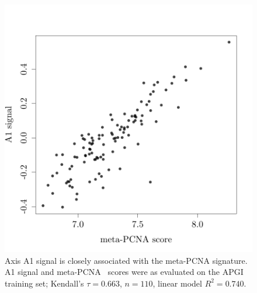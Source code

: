 \documentclass[dissertation.tex]{subfiles}
\begin{document}
\begin{figure}[!htbp]
\centering
\includegraphics[width=.7\linewidth]{analysis/biosurv/reports/18_SIS_diag_dsd_final/figure/nmf-msigdb-cor-plots-5}
\caption[A1 signal is closely associated with meta-PCNA score]{Axis A1 signal is closely associated with the meta-PCNA signature.  A1 signal and meta-PCNA~\cite{Venet2011} scores were as evaluated on the \acrshort{APGI} training set; Kendall's $\tau = 0.663$, $n = 110$, linear model $R^2 = 0.740$.}\label{fig:sigs-axis1-pcna}
\end{figure}
\end{document}

